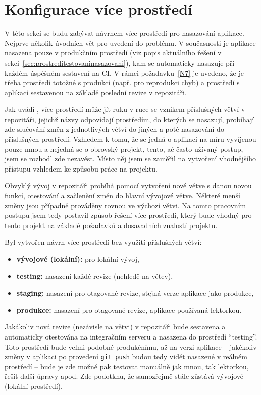 \section{Konfigurace více prostředí}\label{sec:konfiguraceviceprostredi}

V této sekci se budu zabývat návrhem více prostředí pro nasazování aplikace. Nejprve několik úvodních vět pro uvedení do problému. V současnosti je aplikace nasazena pouze v produkčním prostředí (viz popis aktuálního řešení v sekci~\ref{sec:prostreditestovaninasazovani}), kam se automaticky nasazuje při každém úspěšném sestavení na CI. V rámci požadavku~\ref{N7} je uvedeno, že je třeba prostředí totožné s produkcí (např. pro reprodukci chyb) a prostředí s aplikací sestavenou na základě poslední revize v repozitáři.

Jak uvádí \cite{deployment-beanstalk}, více prostředí může jít ruku v ruce se vznikem příslušných větví v repozitáři, jejichž názvy odpovídají prostředím, do kterých se nasazují, probíhají zde slučování změn z jednotlivých větví do jiných a poté nasazování do příslušných prostředí. Vzhledem k tomu, že se jedná o aplikaci na míru vyvíjenou pouze mnou a nejedná se o obrovský projekt, tento, ač často užívaný postup, jsem se rozhodl zde nezavést. Místo něj jsem se zaměřil na vytvoření vhodnějšího přístupu vzhledem ke způsobu práce na projektu.

Obvyklý vývoj v repozitáři probíhá pomocí vytvoření nové větve s danou novou funkcí, otestování a začlenění změn do hlavní vývojové větve. Některé menší změny jsou případně prováděny rovnou ve výchozí větvi. Na tomto pracovním postupu jsem tedy postavil způsob řešení více prostředí, který bude vhodný pro tento projekt na základě požadavků a dosavadních znalostí projektu.

Byl vytvořen návrh více prostředí bez využití příslušných větví:
\begin{itemize}
    \item \textbf{vývojové (lokální):} pro lokální vývoj,
    \item \textbf{testing:} nasazení každé revize (nehledě na větev),
    \item \textbf{staging:} nasazení pro otagované revize, stejná verze aplikace jako produkce,
    \item \textbf{produkce:} nasazení pro otagované revize, aplikace používaná lektorkou.
\end{itemize}

Jakákoliv nová revize (nezávisle na větvi) v repozitáři bude sestavena a automaticky otestována na integračním serveru a nasazena do prostředí \enquote{testing}. Toto prostředí bude velmi podobné produkčnímu, až na verzi aplikace -- jakékoliv změny v aplikaci po provedení \verb|git push| budou tedy vidět nasazené v reálném prostředí -- bude je zde možné pak testovat manuálně jak mnou, tak lektorkou, řešit další úpravy apod. Zde podotknu, že samozřejmě stále zůstává vývojové (lokální prostředí).

